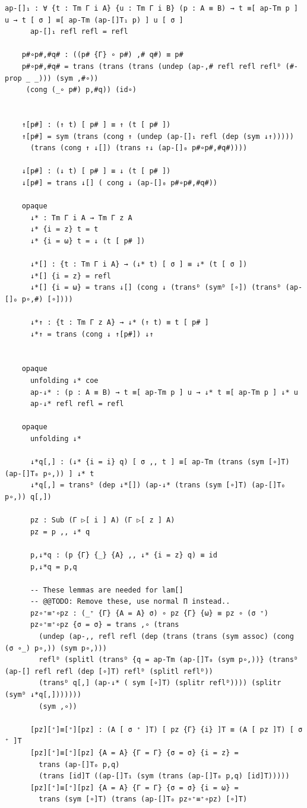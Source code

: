 \documentclass[10pt,a4paper]{article}
\theoremstyle{definition}
\theoremstyle{remark}
\begin{document}
{\begin{Verbatim}[breaklines=true,breakanywhere=true,fontsize=\scriptsize]
      ap-[]₁ : ∀ {t : Tm Γ i A} {u : Tm Γ i B} (p : A ≡ B) → t ≡[ ap-Tm p ] u → t [ σ ] ≡[ ap-Tm (ap-[]T₁ p) ] u [ σ ]
      ap-[]₁ refl refl = refl

    p#∘p#,#q# : ((p# {Γ} ∘ p#) ,# q#) ≡ p#
    p#∘p#,#q# = trans (trans (trans (undep (ap-,# refl refl reflᴰ (#-prop _ _))) (sym ,#∘))
     (cong (_∘ p#) p,#q)) (id∘)


    ↑[p#] : (↑ t) [ p# ] ≡ ↑ (t [ p# ])
    ↑[p#] = sym (trans (cong ↑ (undep (ap-[]₁ refl (dep (sym ↓↑)))))
      (trans (cong ↑ ↓[]) (trans ↑↓ (ap-[]₀ p#∘p#,#q#))))

    ↓[p#] : (↓ t) [ p# ] ≡ ↓ (t [ p# ])
    ↓[p#] = trans ↓[] ( cong ↓ (ap-[]₀ p#∘p#,#q#))

    opaque
      ↓* : Tm Γ i A → Tm Γ z A
      ↓* {i = z} t = t
      ↓* {i = ω} t = ↓ (t [ p# ])

      ↓*[] : {t : Tm Γ i A} → (↓* t) [ σ ] ≡ ↓* (t [ σ ])
      ↓*[] {i = z} = refl
      ↓*[] {i = ω} = trans ↓[] (cong ↓ (transᴰ (symᴰ [∘]) (transᴰ (ap-[]₀ p∘,#) [∘])))

      ↓*↑ : {t : Tm Γ z A} → ↓* (↑ t) ≡ t [ p# ]
      ↓*↑ = trans (cong ↓ ↑[p#]) ↓↑


    opaque
      unfolding ↓* coe
      ap-↓* : (p : A ≡ B) → t ≡[ ap-Tm p ] u → ↓* t ≡[ ap-Tm p ] ↓* u
      ap-↓* refl refl = refl

    opaque
      unfolding ↓*

      ↓*q[,] : (↓* {i = i} q) [ σ ,, t ] ≡[ ap-Tm (trans (sym [∘]T) (ap-[]T₀ p∘,)) ] ↓* t
      ↓*q[,] = transᴰ (dep ↓*[]) (ap-↓* (trans (sym [∘]T) (ap-[]T₀ p∘,)) q[,])

      pz : Sub (Γ ▷[ i ] A) (Γ ▷[ z ] A)
      pz = p ,, ↓* q

      p,↓*q : (p {Γ} {_} {A} ,, ↓* {i = z} q) ≡ id
      p,↓*q = p,q

      -- These lemmas are needed for lam[]
      -- @@TODO: Remove these, use normal Π instead..
      pz∘⁺≡⁺∘pz : (_⁺ {Γ} {A = A} σ) ∘ pz {Γ} {ω} ≡ pz ∘ (σ ⁺)
      pz∘⁺≡⁺∘pz {σ = σ} = trans ,∘ (trans
        (undep (ap-,, refl refl (dep (trans (trans (sym assoc) (cong (σ ∘_) p∘,)) (sym p∘,)))
        reflᴰ (splitl (transᴰ {q = ap-Tm (ap-[]T₀ (sym p∘,))} (transᴰ (ap-[] refl refl (dep [∘]T) reflᴰ (splitl reflᴰ))
        (transᴰ q[,] (ap-↓* ( sym [∘]T) (splitr reflᴰ)))) (splitr (symᴰ ↓*q[,]))))))
        (sym ,∘))

      [pz][⁺]≡[⁺][pz] : (A [ σ ⁺ ]T) [ pz {Γ} {i} ]T ≡ (A [ pz ]T) [ σ ⁺ ]T
      [pz][⁺]≡[⁺][pz] {A = A} {Γ = Γ} {σ = σ} {i = z} =
        trans (ap-[]T₀ p,q)
        (trans [id]T ((ap-[]T₁ (sym (trans (ap-[]T₀ p,q) [id]T)))))
      [pz][⁺]≡[⁺][pz] {A = A} {Γ = Γ} {σ = σ} {i = ω} =
        trans (sym [∘]T) (trans (ap-[]T₀ pz∘⁺≡⁺∘pz) [∘]T)


\end{Verbatim}}
\end{document}
